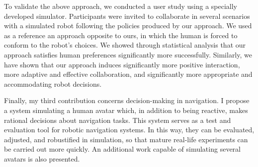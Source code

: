 To validate the above approach, we conducted a user study using a specially developed simulator. Participants were invited to collaborate in several scenarios with a simulated robot following the policies produced by our approach. We used as a reference an approach opposite to ours, in which the human is forced to conform to the robot's choices. We showed through statistical analysis that our approach satisfies human preferences significantly more successfully. Similarly, we have shown that our approach induces significantly more positive interaction, more adaptive and effective collaboration, and significantly more appropriate and accommodating robot decisions.

Finally, my third contribution concerns decision-making in navigation. I propose a system simulating a human avatar which, in addition to being reactive, makes rational decisions about navigation tasks. This system serves as a test and evaluation tool for robotic navigation systems. In this way, they can be evaluated, adjusted, and robustified in simulation, so that mature real-life experiments can be carried out more quickly. An additional work capable of simulating several avatars is also presented.